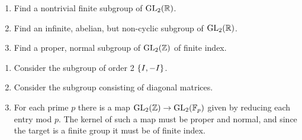 %
\begin{question}[subtitle = January 2020 Problem 5,ID=Jan20_5]
\begin{enumerate}
    \item Find a nontrivial finite subgroup of $\operatorname{GL}_2(\mathbb{R})$.
    \item Find an infinite, abelian, but non-cyclic subgroup of $\operatorname{GL}_2(\mathbb{R})$.
    \item Find a proper, normal subgroup of $\operatorname{GL}_2(\mathbb{Z})$ of finite index.
\end{enumerate}
\end{question}
\begin{solution}
\begin{enumerate}
    \item Consider the subgroup of order 2 $\{I,-I\}$.
    \item Consider the subgroup consisting of diagonal matrices.
    \item For each prime $p$ there is a map $\operatorname{GL}_2(\mathbb{Z}) \to \operatorname{GL}_2(\mathbb{F}_p)$ given by reducing each entry mod $p$. The kernel of such a map must be proper and normal, and since the target is a finite group it must be of finite index.
\end{enumerate}
\end{solution}

